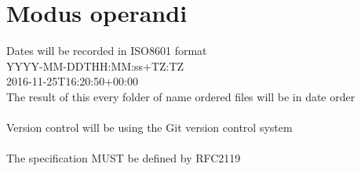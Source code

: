 \section{Modus operandi}
Dates will be recorded in \gls{ISO8601} format\\
YYYY-MM-DDTHH:MM:ss+TZ:TZ\\
2016-11-25T16:20:50+00:00\\
The result of this every folder of name ordered files will be in date order\\
\\
Version control will be using the \gls{Git} version control system\\
\\
The specification MUST be defined by \gls{RFC2119}
